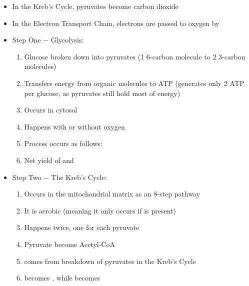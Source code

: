 \documentclass[12pt]{article}
\begin{document}
\begin{itemize}
\item In the Kreb's Cycle, pyruvates become carbon dioxide

\item In the Electron Transport Chain, electrons are passed to oxygen by   

\item Step One $-$ Glycolysis:

  \begin{enumerate}

    \item Glucose broken down into pyruvates (1 6-carbon molecule to 2 3-carbon molecules)

    \item Transfers energy from organic molecules to ATP (generates only 2 ATP per glucose, as pyruvates still hold most of energy)

    \item Occurs in cytosol

    \item Happens with or without oxygen

    \item Process occurs as follows: 

    \item Net yield of  and 

  \end{enumerate}

\item Step Two $-$ The Kreb's Cycle:

  \begin{enumerate}

    \item Occurs in the mitochondrial matrix as an 8-step pathway

    \item It is aerobic (meaning it only occurs if  is present)

    \item Happens twice, one for each pyruvate

    \item Pyruvate become Acetyl-CoA

    \item {} comes from breakdown of pyruvates in the Kreb's Cycle

    \item {} becomes , while  becomes 


\end{enumerate}
\end{itemize}
\end{document}
